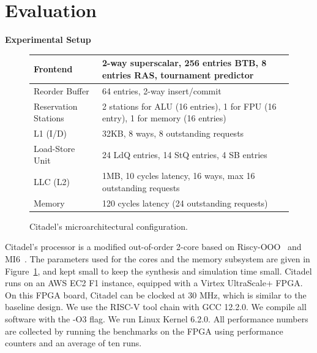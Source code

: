 \section{Evaluation}
\label{sec:eval}

\noindent\textbf{Experimental Setup}
\begin{figure}
\begin{tabular}{ | m{5em} | m{17em} | } 
  \hline
  Frontend & 2-way superscalar, 256 entries BTB, 8 entries RAS, tournament predictor \\
  \hline
  Reorder Buffer &  64 entries, 2-way insert/commit \\
  \hline
  Reservation Stations & 2 stations for ALU (16 entries), 1 for FPU (16 entry), 1 for memory (16 entries) \\
  \hline
  L1 (I/D) &  32KB, 8 ways, 8 outstanding requests \\
  \hline
  Load-Store Unit & 24 LdQ entries, 14 StQ entries, 4 SB entries\\
  \hline
  LLC (L2) & 1MB, 10 cycles latency, 16 ways, max 16 outstanding requests \\
  \hline
  Memory &  120 cycles latency (24 outstanding requests) \\
  \hline
\end{tabular}
    \caption{Citadel's microarchitectural configuration.}
    \label{tab:mi6param}
\end{figure}
Citadel's processor is a modified out-of-order 2-core based on Riscy-OOO~\cite{zhang2018composable} and MI6~\cite{bourgeat2019mi6}.
The parameters used for the cores and the memory subsystem are given in Figure~\ref{tab:mi6param}, and kept small to keep the synthesis and simulation time small.
Citadel runs on an AWS EC2 F1 instance, equipped with a Virtex UltraScale+ FPGA. 
On this FPGA board, Citadel can be clocked at $30$ MHz, which is similar to the baseline design.
We use the RISC-V tool chain with GCC 12.2.0.
We compile all software with the -O3 flag. 
We run Linux Kernel 6.2.0.
All performance numbers are collected by running the benchmarks on the FPGA using performance counters and an average of ten runs. 


